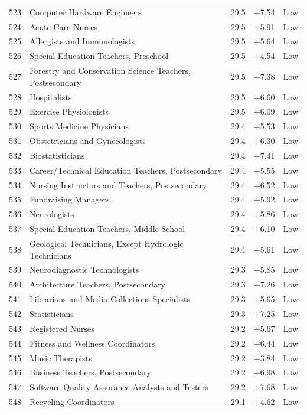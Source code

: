 {\begin{longtable}{rp{7cm}ccc}
523 & Computer Hardware Engineers & 29.5 & +7.54 & Low \\
524 & Acute Care Nurses & 29.5 & +5.91 & Low \\
525 & Allergists and Immunologists & 29.5 & +5.64 & Low \\
526 & Special Education Teachers, Preschool & 29.5 & +4.54 & Low \\
527 & Forestry and Conservation Science Teachers, Postsecondary & 29.5 & +7.38 & Low \\
528 & Hospitalists & 29.5 & +6.60 & Low \\
529 & Exercise Physiologists & 29.5 & +6.09 & Low \\
530 & Sports Medicine Physicians & 29.4 & +5.53 & Low \\
531 & Obstetricians and Gynecologists & 29.4 & +6.30 & Low \\
532 & Biostatisticians & 29.4 & +7.41 & Low \\
533 & Career/Technical Education Teachers, Postsecondary & 29.4 & +5.55 & Low \\
534 & Nursing Instructors and Teachers, Postsecondary & 29.4 & +6.52 & Low \\
535 & Fundraising Managers & 29.4 & +5.92 & Low \\
536 & Neurologists & 29.4 & +5.86 & Low \\
537 & Special Education Teachers, Middle School & 29.4 & +6.10 & Low \\
538 & Geological Technicians, Except Hydrologic Technicians & 29.4 & +5.61 & Low \\
539 & Neurodiagnostic Technologists & 29.3 & +5.85 & Low \\
540 & Architecture Teachers, Postsecondary & 29.3 & +7.26 & Low \\
541 & Librarians and Media Collections Specialists & 29.3 & +5.65 & Low \\
542 & Statisticians & 29.3 & +7.25 & Low \\
543 & Registered Nurses & 29.2 & +5.67 & Low \\
544 & Fitness and Wellness Coordinators & 29.2 & +6.44 & Low \\
545 & Music Therapists & 29.2 & +3.84 & Low \\
546 & Business Teachers, Postsecondary & 29.2 & +6.98 & Low \\
547 & Software Quality Assurance Analysts and Testers & 29.2 & +7.68 & Low \\
548 & Recycling Coordinators & 29.1 & +4.62 & Low \\

\end{longtable}}
